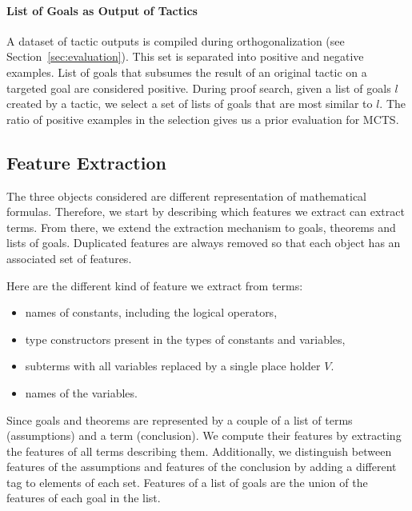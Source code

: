 \documentclass[runningheads,a4paper,draft]{svjour3}
\begin{document}
\paragraph{List of Goals as Output of Tactics}
A dataset of tactic outputs is compiled during orthogonalization (see
Section~\ref{sec:evaluation}).
This set is separated into positive and negative examples.
List of goals that subsumes the result of an original tactic on a
targeted goal are considered positive. During proof search, given a list of
goals $l$ created by a tactic, we select a set of lists of goals that are most
similar to $l$. The ratio of positive examples in the selection gives us a
prior evaluation for MCTS.


\subsection{Feature Extraction}\label{sec:features}
The three objects considered are different representation of mathematical
formulas. Therefore, we start by describing which features we extract can
extract terms. From there, we extend the extraction mechanism
to goals, theorems and lists of goals. Duplicated features are always removed
so that each object has an associated set of features.


Here are the different kind of feature we extract from terms:
\begin{itemize}
\item names of constants, including the logical operators,
\item type constructors present in the types of constants and variables,
\item subterms with all variables replaced by a single place holder $V$.
\item names of the variables.
\end{itemize}

Since goals and theorems are represented by a couple of a list of terms
(assumptions) and a term (conclusion). We compute their features by extracting
the features of all terms describing them. Additionally, we distinguish between
features of the assumptions and features of the conclusion by adding a
different tag to elements of each set. Features of a list of goals are
the union of the features of each goal in the list.
\end{document}
